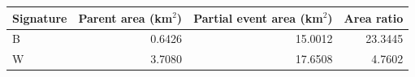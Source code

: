 \begin{tabular}{lrrr}\toprule Signature & Parent area (km$^2$) & Partial event area (km$^2$) & Area ratio\\\midrule
B & 0.6426 & 15.0012 & 23.3445 \\
W & 3.7080 & 17.6508 & 4.7602 \\
\bottomrule\end{tabular}